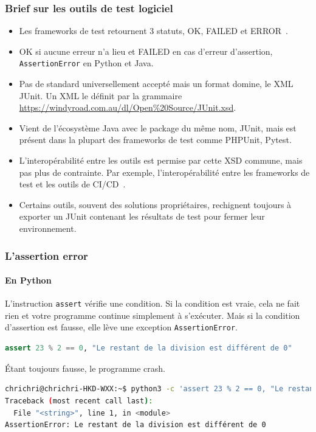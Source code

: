 \documentclass{beamer}
\begin{document}
    \begin{frame}
        \transdissolve
        \frametitle{Brief sur les outils de test logiciel}
        \begin{itemize}
            \item Les frameworks de test retournent 3 statuts, OK, FAILED et ERROR~.

            \item OK si aucune erreur n’a lieu et FAILED en cas d’erreur d’assertion, \lstinline{AssertionError} en Python et Java.

            \item Pas de standard universellement accepté mais un format domine, le XML JUnit.
            Un XML le définit par la grammaire \url{https://windyroad.com.au/dl/Open\%20Source/JUnit.xsd}.

            \item Vient de l’écosystème Java avec le package du même nom, JUnit, mais est présent dans la plupart des frameworks de test comme PHPUnit, Pytest.

            \item L’interopérabilité entre les outils est permise par cette XSD commune, mais pas plus de contrainte.
            Par exemple, l’interopérabilité entre les frameworks de test et les outils de CI/CD~.

            \item Certains outils, souvent des solutions propriétaires, rechignent toujours à exporter un JUnit contenant les résultats de test pour fermer leur environnement.

        \end{itemize}
    \end{frame}


    \begin{frame}[fragile]
        \frametitle{L'assertion error}
        \framesubtitle{En Python}
        \transdissolve
        L’instruction \lstinline{assert} vérifie une condition.
        Si la condition est vraie, cela ne fait rien et votre programme continue simplement à s’exécuter.
        Mais si la condition d’assertion est fausse, elle lève une exception \lstinline{AssertionError}.
        \begin{lstlisting}[language=Python]
assert 23 % 2 == 0, "Le restant de la division est différent de 0"
        \end{lstlisting}
        Étant toujours fausse, le programme crash.
        \begin{lstlisting}[language=sh]
chrichri@chrichri-HKD-WXX:~$ python3 -c 'assert 23 % 2 == 0, "Le restant de la division est différent de 0"'
Traceback (most recent call last):
  File "<string>", line 1, in <module>
AssertionError: Le restant de la division est différent de 0
        \end{lstlisting}
    \end{frame}
\end{document}
